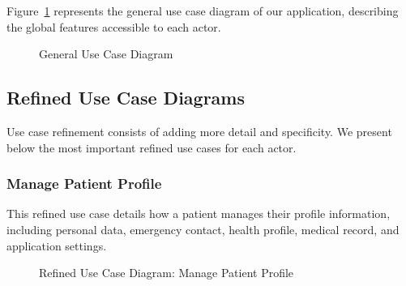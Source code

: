 \documentclass[12pt,a4paper,oneside]{report}
\begin{document}
Figure~\ref{fig:use case general} represents the general use case diagram of our application, describing the global features accessible to each actor.

\begin{figure}[H]
    \centering
    \resizebox{\textwidth}{!}{}
    \caption{General Use Case Diagram}
    \label{fig:use case general}
\end{figure}


\subsection{Refined Use Case Diagrams}

Use case refinement consists of adding more detail and specificity. We present below the most important refined use cases for each actor.

\subsubsection{Manage Patient Profile}

This refined use case details how a patient manages their profile information, including personal data, emergency contact, health profile, medical record, and application settings.

\begin{figure}[H]
    \centering
{}
    \caption{Refined Use Case Diagram: Manage Patient Profile}
    \label{fig:uc patient detail}
\end{figure}
\end{document}
